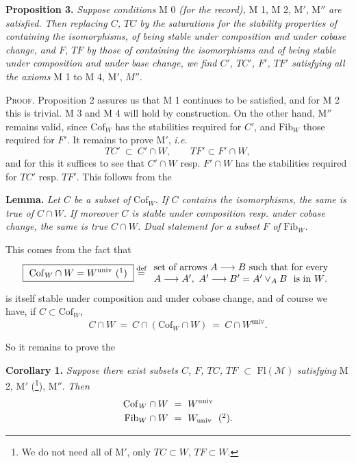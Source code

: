 \documentclass[11pt]{article}
\newcommand{\printedpage}[1]{\marginpar{\footnotesize p.~#1}}
\newcommand{\msp}[1]{\marginpar{\footnotesize [#1]}}
\newcommand{\cM}{\mathcal{M}}
\newcommand{\Fl}{\mathrm{Fl}}
\newcommand{\Cof}{\mathrm{Cof}}
\newcommand{\Fib}{\mathrm{Fib}}
\begin{document}
\textbf{Proposition 3.} \textit{Suppose conditions} M 0 \textit{(for the record),} M 1, M 2, M$'$, M$''$ \textit{are satisfied. Then replacing $C$, $TC$ by the saturations for the stability properties of containing the isomorphisms, of being stable under composition and under cobase change, and $F$, $TF$ by those of containing the isomorphisms and of being stable under composition and under base change, we find $C'$, $TC'$, $F'$, $TF'$ satisfying}
\printedpage{6}
\msp{page 9}\textit{all the axioms} M 1 to M 4, M$'$, $M''$. %

\textsc{Proof}. Proposition 2 assures us that M 1 continues to be satisfied, and for M 2 this is trivial. M 3 and M 4 will hold by construction. On the other hand, M$''$ remains valid, since $\Cof_W$ has the stabilities required for $C'$, and $\Fib_W$ those required for $F'$. It remains to prove M$'$, \textit{i.e.}
\[
TC'\ \subset\ C'\cap W,\qquad TF'\subset F'\cap W,
\]
and for this it suffices to see that $C'\cap W$ resp. $F'\cap W$ has the stabilities required for $TC'$ resp. $TF'$. This follows from the

\textbf{Lemma.} \textit{Let $C$ be a subset of} $\Cof_W$\textit{. If $C$ contains the isomorphisms, the same is true of $C\cap W$. If moreover $C$ is stable under composition resp. under cobase change, the same is true} \textit{$C\cap W$. Dual statement for a subset $F$ of} $\Fib_W$\textit{.}

This comes from the fact that
\[
\boxed{\ \Cof_W\cap W=W^{\mathrm{univ}}\ (\mbox{\footnotemark})\ }
\stackrel{\text{def}}{=}
\begin{array}{l}
\text{set of arrows $A\longrightarrow B$ such that for every}\\
A\longrightarrow A',\ A'\longrightarrow B'=A'\vee_A B\ \ \text{is in $W$.}
\end{array}
\]
is itself stable under composition and under cobase change, and of course we have, if $C\subset\Cof_W$,
\[
C\cap W\ =\ C\cap(\Cof_W\cap W)\ =\ C\cap W^{\mathrm{univ}}.
\]

\msp{page 10}So it remains to prove the

\textbf{Corollary 1.} \textit{Suppose there exist subsets $C$, $F$, $TC$, $TF$ $\subset$} $\Fl(\cM)$ \textit{satisfying} M 2, M$'$ (\footnote{We do not need all of M$'$, only $TC\subset W$, $TF\subset W$.}), M$''$. \textit{Then}
\[
\begin{aligned}
\Cof_W\cap W\ &=\ W^{\mathrm{univ}}\\
\Fib_W\cap W\ &=\ W_{\mathrm{univ}}\ \ (\mbox{\footnotemark}).
\end{aligned}
\]
\end{document}

